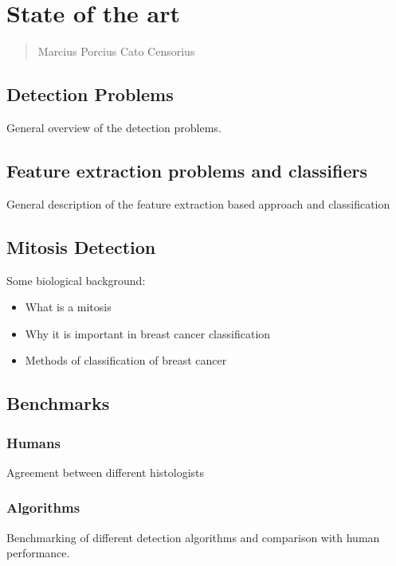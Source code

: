 \chapter{State of the art}
\label{chapter2}
\thispagestyle{empty}

\begin{quotation}
{\footnotesize
{}
\begin{flushright}
Marcius Porcius Cato Censorius
\end{flushright}
}
\end{quotation}
\vspace{0.5cm}


\section{Detection Problems}
General overview of the detection problems.

\vspace{0.5cm}

\section{Feature extraction problems and classifiers}
General description of the feature extraction based approach and classification

\vspace{0.5cm}

\section{Mitosis Detection}
Some biological background:
\begin{itemize}
\item What is a mitosis
\item Why it is important in breast cancer classification
\item Methods of classification of breast cancer
\end{itemize}

\section{Benchmarks}

\vspace{0.5cm}

\subsection{Humans}
Agreement between different histologists

\subsection{Algorithms}
Benchmarking of different detection algorithms and comparison with human performance.